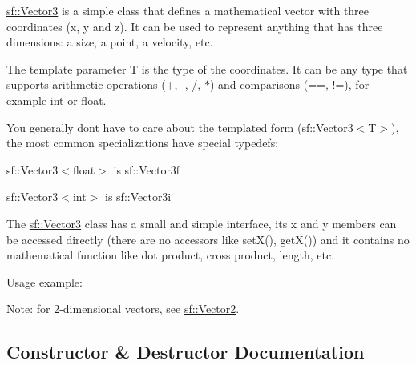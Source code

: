 \begin{DoxyVerb}\end{DoxyVerb}


\mbox{\hyperlink{classsf_1_1_vector3}{sf\+::\+Vector3}} is a simple class that defines a mathematical vector with three coordinates (x, y and z). It can be used to represent anything that has three dimensions\+: a size, a point, a velocity, etc.

The template parameter T is the type of the coordinates. It can be any type that supports arithmetic operations (+, -\/, /, $\ast$) and comparisons (==, !=), for example int or float.

You generally don\textquotesingle{}t have to care about the templated form (sf\+::\+Vector3$<$\+T$>$), the most common specializations have special typedefs\+: \begin{DoxyItemize}
\item sf\+::\+Vector3$<$float$>$ is sf\+::\+Vector3f \item sf\+::\+Vector3$<$int$>$ is sf\+::\+Vector3i\end{DoxyItemize}
The \mbox{\hyperlink{classsf_1_1_vector3}{sf\+::\+Vector3}} class has a small and simple interface, its x and y members can be accessed directly (there are no accessors like set\+X(), get\+X()) and it contains no mathematical function like dot product, cross product, length, etc.

Usage example\+: 
\begin{DoxyCode}{0}
\DoxyCodeLine{}
\DoxyCodeLine{}
\end{DoxyCode}


Note\+: for 2-\/dimensional vectors, see \mbox{\hyperlink{classsf_1_1_vector2}{sf\+::\+Vector2}}. \begin{DoxyVerb}\end{DoxyVerb}
 

\subsection{Constructor \& Destructor Documentation}
\mbox{\label{classsf_1_1_vector3_aee8be1985c6e45e381ad4071265636f9}} 

